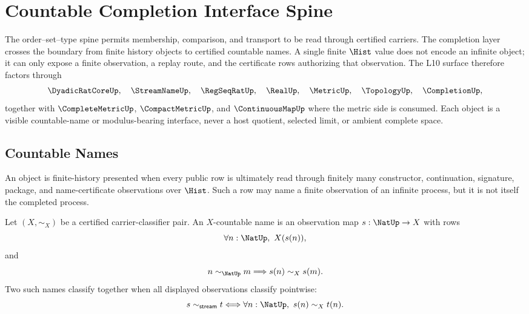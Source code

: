 \chapter{Countable Completion Interface Spine}
\label{ch:visions-countable-completion-interface-spine}

The order--set--type spine permits membership, comparison, and transport to
be read through certified carriers.  The completion layer crosses the
boundary from finite history objects to certified countable names.  A single
finite $\Hist$ value does not encode an infinite object; it can only expose a
finite observation, a replay route, and the certificate rows authorizing that
observation.  The L10 surface therefore factors through
$$
\DyadicRatCoreUp,\quad
\StreamNameUp,\quad
\RegSeqRatUp,\quad
\RealUp,\quad
\MetricUp,\quad
\TopologyUp,\quad
\CompletionUp,
$$
together with $\CompleteMetricUp$, $\CompactMetricUp$, and
$\ContinuousMapUp$ where the metric side is consumed.  Each object is a
visible countable-name or modulus-bearing interface, never a host quotient,
selected limit, or ambient complete space.

\section{Countable Names}
\label{sec:countable-completion-countable-names}

\begin{definition}
\label{def:countable-completion-finite-history-object}
An object is finite-history presented when every public row is ultimately
read through finitely many constructor, continuation, signature, package, and
name-certificate observations over $\Hist$.  Such a row may name a finite
observation of an infinite process, but it is not itself the completed
process.
\end{definition}

\begin{definition}
\label{def:countable-completion-countable-name}
Let $(X,\sim_X)$ be a certified carrier-classifier pair.  An $X$-countable
name is an observation map $s:\NatUp\to X$ with rows
$$
\forall n:\NatUp,\ X(s(n)),
$$
and
$$
n\sim_{\NatUp}m\Longrightarrow s(n)\sim_X s(m).
$$
Two such names classify together when all displayed observations classify
pointwise:
$$
s\sim_{\mathsf{stream}}t
\Longleftrightarrow
\forall n:\NatUp,\ s(n)\sim_X t(n).
$$
\end{definition}

